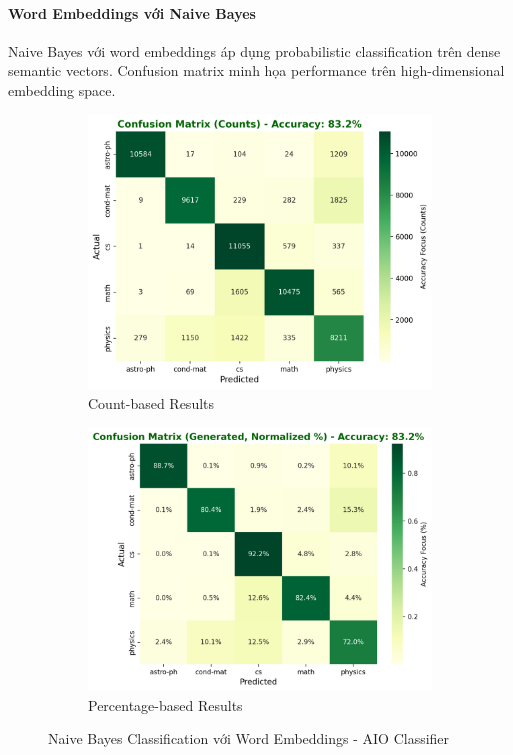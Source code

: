 \paragraph{Word Embeddings với Naive Bayes}

Naive Bayes với word embeddings áp dụng probabilistic classification trên dense semantic vectors. Confusion matrix minh họa performance trên high-dimensional embedding space.

\begin{figure}[H]
\centering
\begin{subfigure}{0.48\textwidth}
    \centering
    \includegraphics[width=\textwidth]{image/NB_embed_count.png}
    \caption{Count-based Results}
    \label{fig:nb_embed_count_improvements}
\end{subfigure}
\hfill
\begin{subfigure}{0.48\textwidth}
    \centering
    \includegraphics[width=\textwidth]{image/NB_embed_percent.png}
    \caption{Percentage-based Results}
    \label{fig:nb_embed_percent_improvements}
\end{subfigure}
\caption{Naive Bayes Classification với Word Embeddings - AIO Classifier}
\label{fig:nb_embed_results_improvements}
\end{figure}

